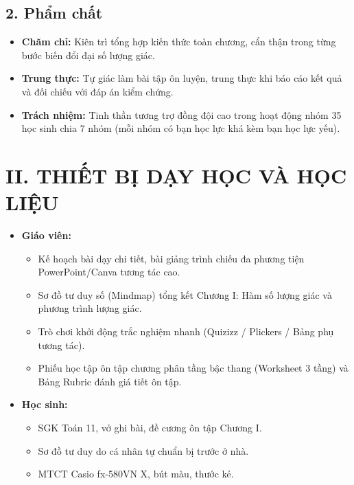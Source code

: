 \documentclass[12pt, a4paper]{article}
\begin{document}
\subsection*{2. Phẩm chất}  
\begin{itemize}[leftmargin=1.2cm]  
    \item \textbf{Chăm chỉ:} Kiên trì tổng hợp kiến thức toàn chương, cẩn thận trong từng bước biến đổi đại số lượng giác.  
    \item \textbf{Trung thực:} Tự giác làm bài tập ôn luyện, trung thực khi báo cáo kết quả và đối chiếu với đáp án kiểm chứng.  
    \item \textbf{Trách nhiệm:} Tinh thần tương trợ đồng đội cao trong hoạt động nhóm 35 học sinh chia 7 nhóm (mỗi nhóm có bạn học lực khá kèm bạn học lực yếu).  
\end{itemize}  
  
\section*{II. THIẾT BỊ DẠY HỌC VÀ HỌC LIỆU}  
\begin{itemize}[leftmargin=1.2cm]  
    \item \textbf{Giáo viên:}  
    \begin{itemize}[leftmargin=0.6cm]  
        \item Kế hoạch bài dạy chi tiết, bài giảng trình chiếu đa phương tiện PowerPoint/Canva tương tác cao.  
        \item Sơ đồ tư duy số (Mindmap) tổng kết Chương I: Hàm số lượng giác và phương trình lượng giác.  
        \item Trò chơi khởi động trắc nghiệm nhanh (Quizizz / Plickers / Bảng phụ tương tác).  
        \item Phiếu học tập ôn tập chương phân tầng bậc thang (Worksheet 3 tầng) và Bảng Rubric đánh giá tiết ôn tập.  
    \end{itemize}  
    \item \textbf{Học sinh:}  
    \begin{itemize}[leftmargin=0.6cm]  
        \item SGK Toán 11, vở ghi bài, đề cương ôn tập Chương I.  
        \item Sơ đồ tư duy do cá nhân tự chuẩn bị trước ở nhà.  
        \item MTCT Casio fx-580VN X, bút màu, thước kẻ.  
    \end{itemize}  
\end{itemize}  
  
\end{document}
